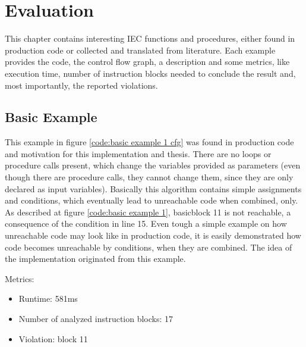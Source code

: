 
\chapter {Evaluation}
\label {cha:evaluation}
This chapter contains interesting IEC functions and procedures, either found in production code or collected and translated from literature.
Each example provides the code, the control flow graph, a description and some metrics, like execution time, number of instruction blocks needed to conclude the result and, most importantly, the reported violations.


\section{Basic Example}
This example in figure \ref{code:basic example 1 cfg} was found in production code and motivation for this implementation and thesis. There are no loops or procedure calls present, which change the variables provided as parameters (even though there are procedure calls, they cannot change them, since they are only declared as input variables).
Basically this algorithm contains simple assignments and conditions, which eventually lead to unreachable code when combined, only.
As described at figure \ref{code:basic example 1}, basicblock 11 is not reachable, a consequence of the condition in line 15.
Even tough a simple example on how unreachable code may look like in production code, it is easily demonstrated how code becomes unreachable by conditions, when they are combined.
The idea of the implementation originated from this example.

Metrics:
\begin{itemize}
	\item Runtime: 581ms
	\item Number of analyzed instruction blocks: 17
	\item Violation: block 11
\end{itemize}


